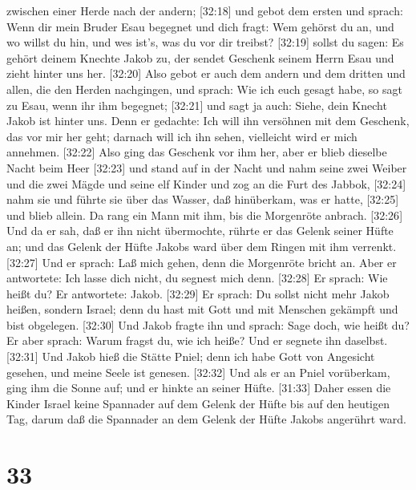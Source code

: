zwischen einer Herde nach der andern;  {[}32:18{]} und
gebot dem ersten und sprach: Wenn dir mein Bruder Esau begegnet und dich
fragt: Wem gehörst du an, und wo willst du hin, und wes ist's, was du
vor dir treibst?  {[}32:19{]} sollst du sagen: Es gehört
deinem Knechte Jakob zu, der sendet Geschenk seinem Herrn Esau und zieht
hinter uns her.  {[}32:20{]} Also gebot er auch dem andern
und dem dritten und allen, die den Herden nachgingen, und sprach: Wie
ich euch gesagt habe, so sagt zu Esau, wenn ihr ihm begegnet;
 {[}32:21{]} und sagt ja auch: Siehe, dein Knecht Jakob ist
hinter uns. Denn er gedachte: Ich will ihn versöhnen mit dem Geschenk,
das vor mir her geht; darnach will ich ihn sehen, vielleicht wird er
mich annehmen.  {[}32:22{]} Also ging das Geschenk vor ihm
her, aber er blieb dieselbe Nacht beim Heer  {[}32:23{]}
und stand auf in der Nacht und nahm seine zwei Weiber und die zwei Mägde
und seine elf Kinder und zog an die Furt des Jabbok, 
{[}32:24{]} nahm sie und führte sie über das Wasser, daß hinüberkam, was
er hatte,  {[}32:25{]} und blieb allein. Da rang ein Mann
mit ihm, bis die Morgenröte anbrach.  {[}32:26{]} Und da er
sah, daß er ihn nicht übermochte, rührte er das Gelenk seiner Hüfte an;
und das Gelenk der Hüfte Jakobs ward über dem Ringen mit ihm verrenkt.
 {[}32:27{]} Und er sprach: Laß mich gehen, denn die
Morgenröte bricht an. Aber er antwortete: Ich lasse dich nicht, du
segnest mich denn.  {[}32:28{]} Er sprach: Wie heißt du? Er
antwortete: Jakob.  {[}32:29{]} Er sprach: Du sollst nicht
mehr Jakob heißen, sondern Israel; denn du hast mit Gott und mit
Menschen gekämpft und bist obgelegen.  {[}32:30{]} Und
Jakob fragte ihn und sprach: Sage doch, wie heißt du? Er aber sprach:
Warum fragst du, wie ich heiße? Und er segnete ihn daselbst.
 {[}32:31{]} Und Jakob hieß die Stätte Pniel; denn ich habe
Gott von Angesicht gesehen, und meine Seele ist genesen. 
{[}32:32{]} Und als er an Pniel vorüberkam, ging ihm die Sonne auf; und
er hinkte an seiner Hüfte.  {[}31:33{]} Daher essen die
Kinder Israel keine Spannader auf dem Gelenk der Hüfte bis auf den
heutigen Tag, darum daß die Spannader an dem Gelenk der Hüfte Jakobs
angerührt ward.

\hypertarget{section-32}{%
\section{33}\label{section-32}}


